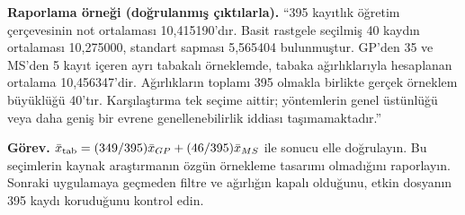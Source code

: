 \textbf{Raporlama örneği (doğrulanmış çıktılarla).}
``395 kayıtlık öğretim çerçevesinin not ortalaması 10,415190'dır.
Basit rastgele seçilmiş 40 kaydın ortalaması 10,275000, standart sapması
5,565404 bulunmuştur. GP'den 35 ve MS'den 5 kayıt içeren ayrı tabakalı
örneklemde, tabaka ağırlıklarıyla hesaplanan ortalama 10,456347'dir.
Ağırlıkların toplamı 395 olmakla birlikte gerçek örneklem büyüklüğü
40'tır. Karşılaştırma tek seçime aittir; yöntemlerin genel üstünlüğü
veya daha geniş bir evrene genellenebilirlik iddiası taşımamaktadır.''


\textbf{Görev.} $\bar x_{\rm tab}=(349/395)\bar x_{GP}+(46/395)\bar x_{MS}$
ile sonucu elle doğrulayın. Bu seçimlerin kaynak araştırmanın özgün
örnekleme tasarımı olmadığını raporlayın. Sonraki uygulamaya geçmeden
filtre ve ağırlığın kapalı olduğunu, etkin dosyanın 395 kaydı koruduğunu
kontrol edin.